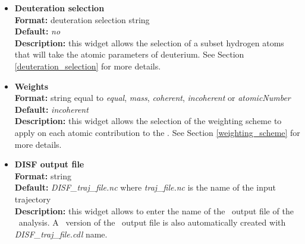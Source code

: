 \documentclass[a4paper,11pt]{report}
\begin{document}
\begin{itemize}
\hypertarget{disf_deuteration_selection}{}
\item \textbf{Deuteration selection}\\
\textbf{Format:} deuteration selection string\\
\textbf{Default:} \textit{no}\\
\textbf{Description:} this widget allows the selection of a subset hydrogen atoms that will take the atomic parameters 
of deuterium. See Section \ref{deuteration_selection} for more details.

\hypertarget{disf_weights}{}
\item \textbf{Weights}\\
\textbf{Format:} string equal to \textit{equal}, \textit{mass}, \textit{coherent}, \textit{incoherent} or \textit{atomicNumber}\\
\textbf{Default:} \textit{incoherent}\\
\textbf{Description:} this widget allows the selection of the weighting scheme to apply on each atomic contribution 
to the \DISF . See Section \ref{weighting_scheme} for more details. 

\hypertarget{disf_disf_output_file}{}
\item \textbf{DISF output file}\\
\textbf{Format:} string\\
\textbf{Default:} \textit{DISF\_traj\_file.nc} where \textit{traj\_file.nc} is the name of the input trajectory\\
\textbf{Description:} this widget allows to enter the name of the \NetCDF\ output file of the \DISF\ analysis. A \CDL\ 
version of the \NetCDF\ output file is also automatically created with \textit{DISF\_traj\_file.cdl} name.
\end{itemize}
\end{document}

